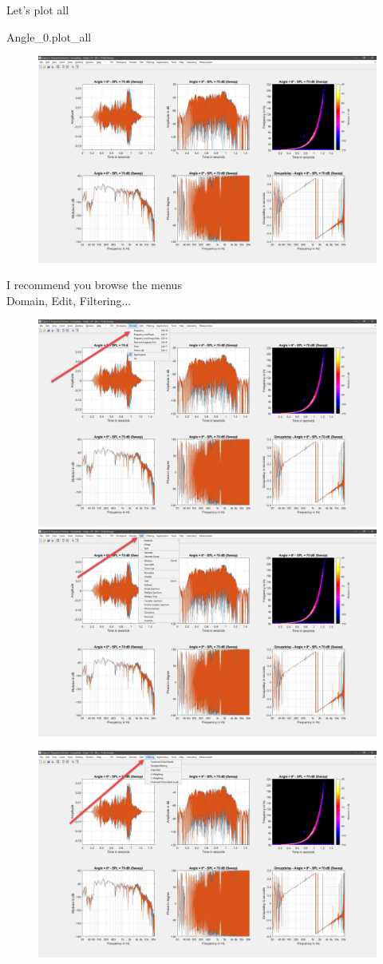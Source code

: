 \documentclass[12pt, a4paper, twoside, onecolumn]{article}%
\begin{document}
Let's plot all

\begin{matlabbox}
Angle_0.plot_all
\end{matlabbox}

\begin{figure}[H] \centering
\includegraphics[width=.7\textwidth]{Figures/E1.jpg}
\end{figure}

I recommend you browse the menus\\
Domain, Edit, Filtering...
\begin{figure}[H] \centering
\includegraphics[width=.45\textwidth]{Figures/E2.jpg}
\includegraphics[width=.45\textwidth]{Figures/E3.jpg}
\end{figure}
\begin{figure}[H] \centering
\includegraphics[width=.45\textwidth]{Figures/E4.jpg}
\end{figure}
\end{document}
